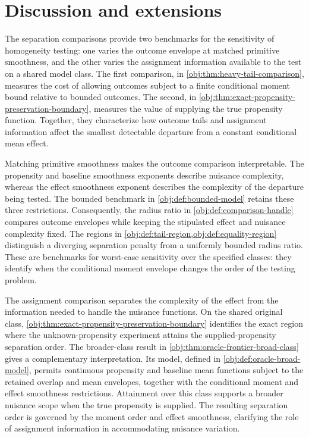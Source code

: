 \section{Discussion and extensions}

The separation comparisons provide two benchmarks for the sensitivity of homogeneity testing: one varies the outcome envelope at matched primitive smoothness, and the other varies the assignment information available to the test on a shared model class. The first comparison, in \cref{obj:thm:heavy-tail-comparison}, measures the cost of allowing outcomes subject to a finite conditional moment bound relative to bounded outcomes. The second, in \cref{obj:thm:exact-propensity-preservation-boundary}, measures the value of supplying the true propensity function. Together, they characterize how outcome tails and assignment information affect the smallest detectable departure from a constant conditional mean effect.

Matching primitive smoothness makes the outcome comparison interpretable. The propensity and baseline smoothness exponents describe nuisance complexity, whereas the effect smoothness exponent describes the complexity of the departure being tested. The bounded benchmark in \cref{obj:def:bounded-model} retains these three restrictions. Consequently, the radius ratio in \cref{obj:def:comparison-handle} compares outcome envelopes while keeping the stipulated effect and nuisance complexity fixed. The regions in \cref{obj:def:tail-region,obj:def:equality-region} distinguish a diverging separation penalty from a uniformly bounded radius ratio. These are benchmarks for worst-case sensitivity over the specified classes: they identify when the conditional moment envelope changes the order of the testing problem.

The assignment comparison separates the complexity of the effect from the information needed to handle the nuisance functions. On the shared original class, \cref{obj:thm:exact-propensity-preservation-boundary} identifies the exact region where the unknown-propensity experiment attains the supplied-propensity separation order. The broader-class result in \cref{obj:thm:oracle-frontier-broad-class} gives a complementary interpretation. Its model, defined in \cref{obj:def:oracle-broad-model}, permits continuous propensity and baseline mean functions subject to the retained overlap and mean envelopes, together with the conditional moment and effect smoothness restrictions. Attainment over this class supports a broader nuisance scope when the true propensity is supplied. The resulting separation order is governed by the moment order and effect smoothness, clarifying the role of assignment information in accommodating nuisance variation.

